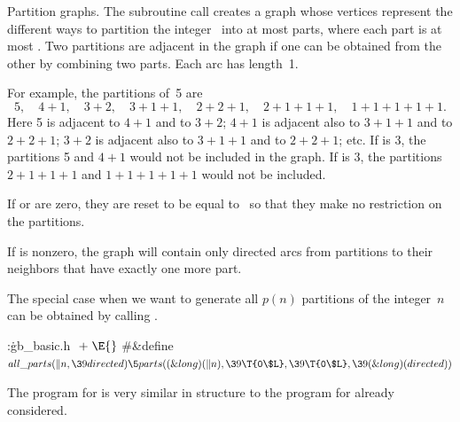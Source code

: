 Partition graphs. The subroutine call
creates a graph whose vertices represent the different ways to partition
the integer~ into at most  parts, where each part is
at most
. Two partitions are adjacent in the graph if
one can be obtained from the other by combining two parts.
Each arc has length~1.

For example, the partitions of~5 are
$$5,\quad 4+1,\quad 3+2,\quad 3+1+1,\quad 2+2+1,
\quad 2+1+1+1,\quad 1+1+1+1+1.$$
Here 5 is adjacent to $4+1$ and to $3+2$; $4+1$ is adjacent also to
$3+1+1$ and to $2+2+1$; $3+2$ is adjacent also to $3+1+1$ and to $2+2+1$; etc.
If  is 3, the partitions 5 and $4+1$ would not be included in
the graph. If  is 3, the partitions $2+1+1+1$ and
$1+1+1+1+1$
would not be included.

If  or  are zero, they are reset to be
equal to~
so that they make no restriction on the partitions.

If  is nonzero, the graph will contain only directed arcs from
partitions to their neighbors that have exactly one more part.

The special case when we want to generate all $p(n)$ partitions of the
integer~$n$ can be obtained by calling .

\Y\B\4:\.{gb\_basic.h }\X${}\mathrel+\E{}$\6
\8\#\&{define} ${}\\{all\_parts}(\|n,\39\\{directed})\5\\{parts}((\&{long})(%
\|n),\39\T{0\$L},\39\T{0\$L},\39(\&{long})(\\{directed})){}$\par
\fi

The program for  is very similar in structure to the
program
for  already considered.

